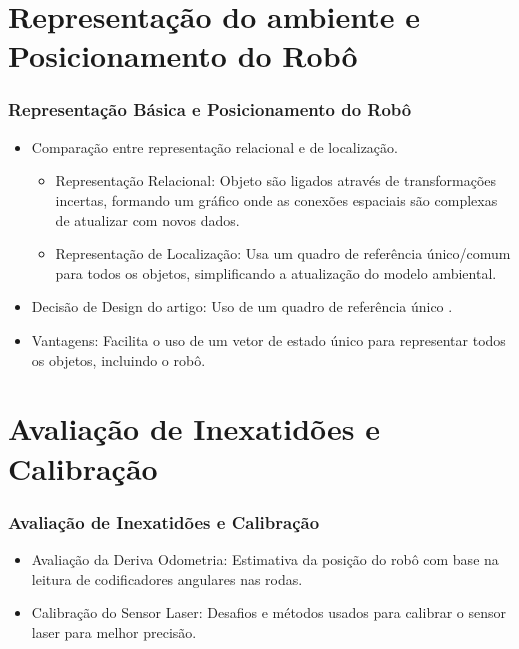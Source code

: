 \documentclass[xcolor=dvipsnames, aspectratio=169]{beamer}
\begin{document}
\section{Representação do ambiente e Posicionamento do Robô}
  \begin{frame}
  \frametitle{Representação Básica e Posicionamento do Robô}
  \begin{itemize}
      \item Comparação entre representação relacional e de localização.
      \begin{itemize}
        \item Representação Relacional: Objeto são ligados através de transformações incertas, formando um gráfico onde as conexões espaciais são complexas de atualizar com novos dados.
        \item Representação de Localização: Usa um quadro de referência único/comum para todos os objetos, simplificando a atualização do modelo ambiental.
      \end{itemize}
      \item Decisão de Design do artigo: Uso de um quadro de referência único \cite{moutarlier2006experimental}.
      \item Vantagens: Facilita o uso de um vetor de estado único para representar todos os objetos, incluindo o robô.
  \end{itemize}
\end{frame}
  

\section{Avaliação de Inexatidões e Calibração}
  \begin{frame}
  \frametitle{Avaliação de Inexatidões e Calibração}
  \begin{itemize}
      \item Avaliação da Deriva Odometria: Estimativa da posição do robô com base na leitura de codificadores angulares nas rodas.
      \item Calibração do Sensor Laser: Desafios e métodos usados para calibrar o sensor laser para melhor precisão.
  \end{itemize}
\end{frame}
  

\end{document}
